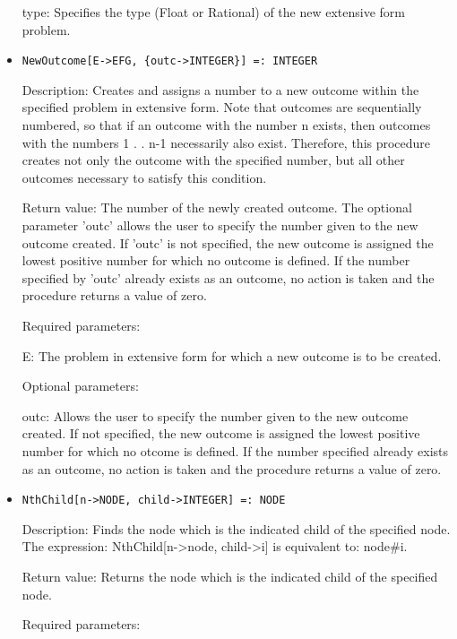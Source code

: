 \begin{itemize}
\bd
\item
[type:] Specifies the type (Float or Rational) of the new extensive
form problem.
\ed
\ed

\item
\protect \large \begin{verbatim}
NewOutcome[E->EFG, {outc->INTEGER}] =: INTEGER
\end{verbatim}\normalsize

\bd
\item
[Description:] Creates and assigns a number to a new outcome within
the specified problem in extensive form.  Note that outcomes are
sequentially numbered, so that if an outcome with the number n exists,
then outcomes with the numbers 1 . . n-1 necessarily also exist.
Therefore, this procedure creates not only the outcome with the
specified number, but all other outcomes necessary to satisfy this
condition.
\item
[Return value:] The number of the newly created outcome.  The optional
parameter 'outc' allows the user to specify the number given to the
new outcome created.  If 'outc' is not specified, the new outcome is
assigned the lowest positive number for which no outcome is defined.
If the number specified by 'outc' already exists as an outcome, no
action is taken and the procedure returns a value of zero.
\item
[Required parameters:]\hfil\null

\bd
\item
[E:] The problem in extensive form for which a new outcome is to be
created.
\ed

\item
[Optional parameters:]\hfil\null

\bd
\item
[outc:] Allows the user to specify the number given to the new outcome
created.  If not specified, the new outcome is assigned the lowest
positive number for which no otcome is defined.  If the number
specified already exists as an outcome, no action is taken and the
procedure returns a value of zero.
\ed
\ed

\item
\protect \large \begin{verbatim}
NthChild[n->NODE, child->INTEGER] =: NODE
\end{verbatim}\normalsize

\bd
\item
[Description:] Finds the node which is the indicated child of the
specified node.  The expression: NthChild[n->node, child->i] is
equivalent to: node\#i.
\item
[Return value:] Returns the node which is the indicated child of the
specified node.
\item
[Required parameters:]\hfil\null
	  

\end{itemize}

